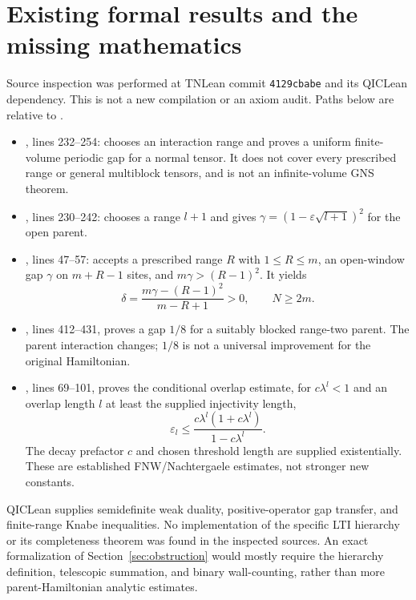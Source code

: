 \documentclass{article}
\begin{document}
\section{Existing formal results and the missing mathematics}
\label{sec:lean}

Source inspection was performed at TNLean commit \texttt{4129cbabe} and
its QICLean dependency. This is not a new compilation or an axiom audit.
Paths below are relative to .
\begin{itemize}
  \item {}, lines 232--254:
   chooses an interaction
  range and proves a uniform finite-volume periodic gap for a normal
  tensor. It does not cover every prescribed range or general multiblock
  tensors, and is not an infinite-volume GNS theorem.
  \item {}, lines 230--242:
   chooses a range
  $l+1$ and gives $\gamma=(1-\varepsilon\sqrt{l+1})^2$ for the open parent.
  \item {}, lines 47--57:
   accepts a
  prescribed range $R$ with $1\leq R\leq m$, an open-window gap $\gamma$
  on $m+R-1$ sites, and $m\gamma>(R-1)^2$. It yields
  \begin{equation}
    \delta=\frac{m\gamma-(R-1)^2}{m-R+1}>0,
    \qquad N\geq2m.
  \end{equation}
  \item {}, lines 412--431, proves a gap
  $1/8$ for a suitably blocked range-two parent. The parent interaction
  changes; $1/8$ is not a universal improvement for the original Hamiltonian.
  \item {}, lines 69--101, proves the conditional
  overlap estimate, for $c\lambda^l<1$ and an overlap length $l$ at
  least the supplied injectivity length,
  \begin{equation}
    \varepsilon_l\leq
    \frac{c\lambda^l(1+c\lambda^l)}{1-c\lambda^l}.
  \end{equation}
  The decay prefactor $c$ and chosen threshold length are supplied
  existentially. These are established FNW/Nachtergaele estimates,
  not stronger new constants.
\end{itemize}
QICLean supplies semidefinite weak duality, positive-operator gap transfer,
and finite-range Knabe inequalities. No implementation of the specific
LTI hierarchy or its completeness theorem was found in the inspected
sources. An exact formalization of Section~\ref{sec:obstruction} would
mostly require the hierarchy definition, telescopic summation, and binary
wall-counting, rather than more parent-Hamiltonian analytic estimates.
\end{document}
